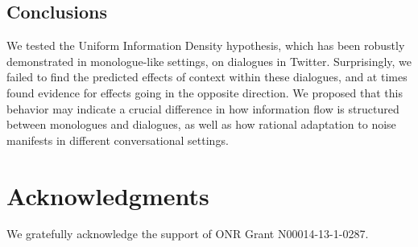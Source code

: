 \documentclass[11pt,letterpaper]{article}
\begin{document}
\subsection{Conclusions}

We tested the Uniform Information Density hypothesis, which has been robustly demonstrated in monologue-like settings, on dialogues in Twitter. Surprisingly, we failed to find the predicted effects of context within these dialogues, and at times found evidence for effects going in the opposite direction.  We proposed that this behavior may indicate a crucial difference in how information flow is structured between monologues and dialogues, as well as how rational adaptation to noise manifests in different conversational settings.

\section*{Acknowledgments}

We gratefully acknowledge the support of ONR Grant N00014-13-1-0287.

\newpage


\end{document}
